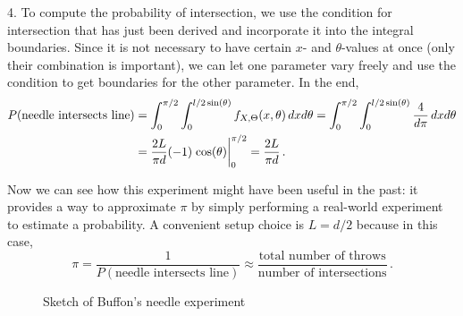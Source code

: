\begin{ex}
4. To compute the probability of intersection, we use the condition for intersection that has just been derived and incorporate it into the integral boundaries. Since it is not necessary to have certain $x$- and $\theta$-values at once (only their combination is important), we can let one parameter vary freely and use the condition to get boundaries for the other parameter. In the end,
\begin{align*}
P(\text{needle intersects line}) &= \int_0^{\pi / 2} \int_0^{l / 2 \sin(\theta)} f_{X, \Theta}(x, \theta) \, dx d\theta = \int_0^{\pi / 2} \int_0^{l / 2 \sin(\theta)} \frac{4}{d \pi} \, dx d\theta
\\
&= \frac{2 L}{\pi d} (- 1) \eval{\cos(\theta)}_0^{\pi / 2} = \frac{2 L}{\pi d} \, .
\end{align*}

Now we can see how this experiment might have been useful in the past: it provides a way to approximate $\pi$ by simply performing a real-world experiment to estimate a probability. A convenient setup choice is $L = d / 2$ because in this case,
\begin{equation*}
\pi = \frac{1}{P(\text{needle intersects line})} \approx \frac{\text{total number of throws}}{\text{number of intersections}} \, .
\end{equation*}
\end{ex}



\begin{figure}[t]
\centering


\caption{Sketch of Buffon's needle experiment}
\label{fig:buffon_needle}
\end{figure}



